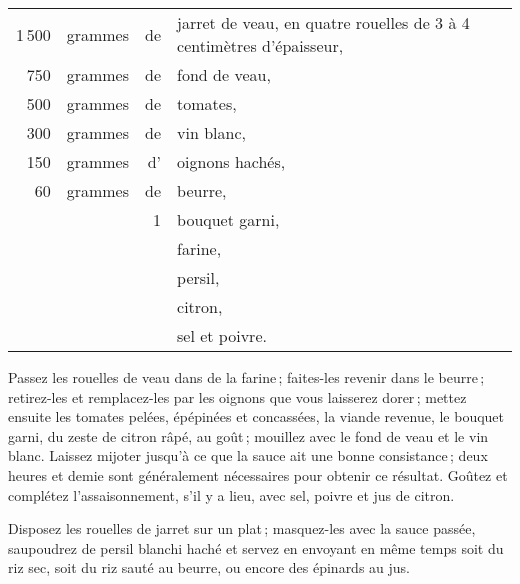 \footnotesize
\begin{longtable}{rrrp{16em}}
  1 500 & grammes & de & jarret de veau, en quatre rouelles de 3 à 4 centimètres d'épaisseur,              \\
    750 & grammes & de & fond de veau,                                                                    \\
    500 & grammes & de & tomates,                                                                         \\
    300 & grammes & de & vin blanc,                                                                       \\
    150 & grammes & d' & oignons hachés,                                                                  \\
     60 & grammes & de & beurre,                                                                          \\
        &         &  1 & bouquet garni,                                                                   \\
        &         &    & farine,                                                                          \\
        &         &    & persil,                                                                          \\
        &         &    & citron,                                                                          \\
        &         &    & sel et poivre.                                                                   \\
\end{longtable}
\normalsize

Passez les rouelles de veau dans de la farine ; faites-les revenir dans le
beurre ; retirez-les et remplacez-les par les oignons que vous laisserez
dorer ; mettez ensuite les tomates pelées, épépinées et concassées, la viande
revenue, le bouquet garni, du zeste de citron râpé, au goût ; mouillez avec le
fond de veau et le vin blanc. Laissez mijoter jusqu'à ce que la sauce ait une
bonne consistance ; deux heures et demie sont généralement nécessaires pour
obtenir ce résultat. Goûtez et complétez l'assaisonnement, s'il y a lieu, avec
sel, poivre et jus de citron.

Disposez les rouelles de jarret sur un plat ; masquez-les avec la sauce passée,
saupoudrez de persil blanchi haché et servez en envoyant en même temps soit du
riz sec, soit du riz sauté au beurre, ou encore des épinards au jus.

